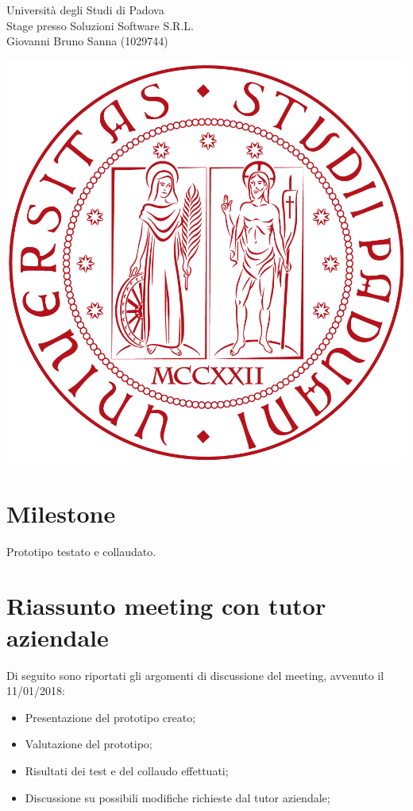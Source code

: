\documentclass[11pt,notitlepage]{article}
\newcommand{\nomeStudente}{Giovanni Bruno}
\newcommand{\cognomeStudente}{Sanna}
\newcommand{\matricolaStudente}{1029744}
\newcommand{\ragioneSocAzienda}{Soluzioni Software S.R.L.}
\begin{document}
\noindent
\parbox{0.7\columnwidth}{Università degli Studi di Padova\\
	Stage presso \ragioneSocAzienda{}\\
	\nomeStudente{} \cognomeStudente{} (\matricolaStudente{})}%
\parbox{0.3\columnwidth}{
	\hfill \includegraphics[scale=0.08]{immagini/logo-unipd.png}}

\bigskip
\section*{Milestone}
Prototipo testato e collaudato.

\bigskip
\section*{Riassunto meeting con tutor aziendale}
Di seguito sono riportati gli argomenti di discussione del meeting, avvenuto il 11/01/2018:
\begin{itemize}
		\item Presentazione del prototipo creato;
		\item Valutazione del prototipo;
		\item Risultati dei test e del collaudo effettuati;
		\item Discussione su possibili modifiche richieste dal tutor aziendale;
\end{itemize} 
\end{document}
